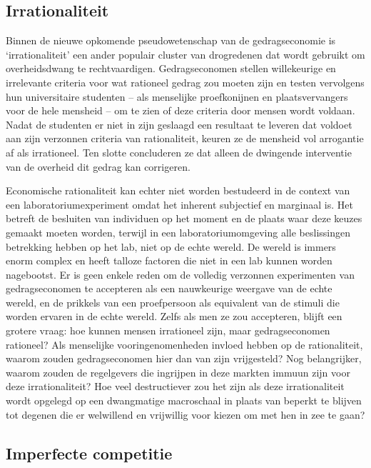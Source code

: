 \subsection{Irrationaliteit}

Binnen de nieuwe opkomende pseudowetenschap van de gedragseconomie is `irrationaliteit' een ander populair cluster van drogredenen dat wordt gebruikt om overheidsdwang te rechtvaardigen. Gedragseconomen stellen willekeurige en irrelevante criteria voor wat rationeel gedrag zou moeten zijn en testen vervolgens hun universitaire studenten -- als menselijke proefkonijnen en plaatsvervangers voor de hele mensheid -- om te zien of deze criteria door mensen wordt voldaan. Nadat de studenten er niet in zijn geslaagd een resultaat te leveren dat voldoet aan zijn verzonnen criteria van rationaliteit, keuren ze de mensheid vol arrogantie af als irrationeel. Ten slotte concluderen ze dat alleen de dwingende interventie van de overheid dit gedrag kan corrigeren.

Economische rationaliteit kan echter niet worden bestudeerd in de context van een laboratoriumexperiment omdat het inherent subjectief en marginaal is. Het betreft de besluiten van individuen op het moment en de plaats waar deze keuzes gemaakt moeten worden, terwijl in een laboratoriumomgeving alle beslissingen betrekking hebben op het lab, niet op de echte wereld. De wereld is immers enorm complex en heeft talloze factoren die niet in een lab kunnen worden nagebootst. Er is geen enkele reden om de volledig verzonnen experimenten van gedragseconomen te accepteren als een nauwkeurige weergave van de echte wereld, en de prikkels van een proefpersoon als equivalent van de stimuli die worden ervaren in de echte wereld. Zelfs als men ze zou accepteren, blijft een grotere vraag: hoe kunnen mensen irrationeel zijn, maar gedragseconomen rationeel? Als menselijke vooringenomenheden invloed hebben op de rationaliteit, waarom zouden gedragseconomen hier dan van zijn vrijgesteld? Nog belangrijker, waarom zouden de regelgevers die ingrijpen in deze markten immuun zijn voor deze irrationaliteit? Hoe veel destructiever zou het zijn als deze irrationaliteit wordt opgelegd op een dwangmatige macroschaal in plaats van beperkt te blijven tot degenen die er welwillend en vrijwillig voor kiezen om met hen in zee te gaan?

\subsection{Imperfecte competitie}


